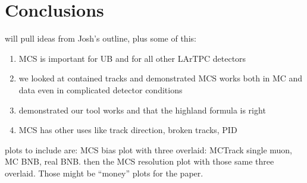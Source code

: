 \section{Conclusions}
will pull ideas from Josh's outline, plus some of this:
\begin{enumerate}
\item MCS is important for UB and for all other LArTPC detectors
\item we looked at contained tracks and demonstrated MCS works both in MC and data even in complicated detector conditions
\item demonstrated our tool works and that the highland formula is right
\item MCS has other uses like track direction, broken tracks, PID
\end{enumerate}

plots to include are: MCS bias plot with three overlaid: MCTrack single muon, MC BNB, real BNB. then the MCS resolution plot with those same three overlaid. Those might be ``money'' plots for the paper.